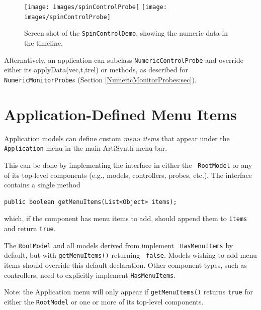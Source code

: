 \begin{figure}[ht]
\begin{center}
\iflatexml
 \texttt{[image: images/spinControlProbe]}
\else
 \texttt{[image: images/spinControlProbe]}
\fi
\end{center}
\caption{Screen shot of the {\tt SpinControlDemo}, showing the
numeric data in the timeline.}
\label{spinControlProbe:fig}
\end{figure}

Alternatively, an application can subclass {\tt NumericControlProbe}
and override either its %
{applyData(vec,t,trel)} or 
methods, as described for {\tt NumericMonitorProbe}s (Section
\ref{NumericMonitorProbes:sec}).

\section{Application-Defined Menu Items}
\label{MenuItems:sec}

Application models can define custom {\it menu items} that appear
under the {\tt Application} menu in the main ArtiSynth menu bar.

This can be done by implementing the interface
 in either the {\tt
RootModel} or any of its top-level components (e.g., models,
controllers, probes, etc.). The interface contains a single
method
\begin{lstlisting}[]
   public boolean getMenuItems(List<Object> items);
\end{lstlisting}
%
which, if the component has menu items to add, should append them
to {\tt items} and return {\tt true}.

The {\tt RootModel} and all models derived from
 implement {\tt
HasMenuItems} by default, but with {\tt getMenuItems()} returning {\tt
false}. Models wishing to add menu items should override this default
declaration. Other component types, such as controllers, need to
explicitly implement {\tt HasMenuItems}.

\begin{sideblock}
Note: the {\sf Application} menu will only appear if {\tt getMenuItems()} returns
{\tt true} for either the {\tt RootModel} or one or more of its
top-level components.
\end{sideblock}

